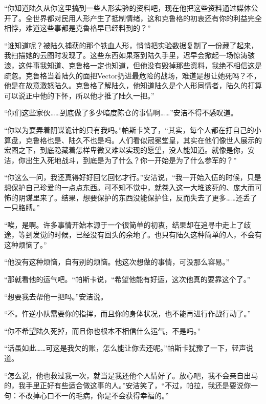 “你知道陆久从你这里搞到一些人形实验的资料吧，现在他把这些资料通过媒体公开了。全世界都对民用人形产生了抵制情绪，这和克鲁格的初衷还有你的利益完全相悖，难道这些事都是克鲁格早已经料到的？”

“谁知道呢？被陆久捕获的那个铁血人形，悄悄把实验数据复制了一份藏了起来，我扫描她的云图时发现了。这些东西如果落到陆久手里，迟早会掀起一场惊涛骇浪，这件事我知道、克鲁格一定也知道，但他没有毁掉那些资料，我绝不相信这是疏忽。克鲁格当着陆久的面把Vector扔进最危险的战场，难道是想让她死吗？不，他是在故意激怒陆久。克鲁格了解陆久，他知道陆久是个人形同情者，陆久的打算可以说正中他的下怀，所以他才推了陆久一把。”

“你们这些家伙……到底做了多少暗度陈仓的事情啊……”安洁不得不感叹道。

“你以为耍弄着阴谋诡计的只有我吗。”帕斯卡笑了，“其实，每个人都在打自己的小算盘，克鲁格也是、陆久不也是吗。人们看似冠冕堂皇，其实在他们像世人展示的宏图之下，到底隐藏着怎样卑微又难以实现的愿望，没人能知道。就像是你，安洁，你出生入死地战斗，到底是为了什么？你一开始是为了什么参军的？”

“你这么一问，我还真得好好回忆回忆才行。”安洁说，“我一开始入伍的时候，只是想保护自己珍爱的一点点东西。可不知不觉中，就卷入这一大堆该死的、庞大而可怖的阴谋里来了。结果，想要保护的东西没能保护住，反而失去了更多……还丢了一只胳膊。”

“唉，是啊。许多事情开始本源于一个很简单的初衷，结果却在追寻中走上了歧途，等到发觉的时候，已经没有回头的余地了。也只有陆久这种简单的人，不会有这种烦恼了。”

“他没有这种烦恼，自有别的烦恼。他这次想做的事情，可没那么容易。”

“那就看他的运气吧。“帕斯卡说，“希望他能有好运，这次他真的要靠这个了。”

“想要我去帮他一把吗。”安洁说。

“不。忤逆小队需要你的指挥，而且你的身体状况，也不能再进行作战行动了。”

“你不希望陆久死掉，而且你也根本不相信什么运气，不是吗。”

“话虽如此……可这是我欠的账，怎么能让你去还呢。”帕斯卡犹豫了一下，轻声说道。

“怎么说，他也救过我一次，就当是我还他个人情好了。放心吧，我不会亲自出马的，我手里正好有些适合做这事的人。”安洁笑了，“不过，帕拉，我还是要说你一句：不改掉心口不一的毛病，你是不会获得幸福的。”

\section*{}

